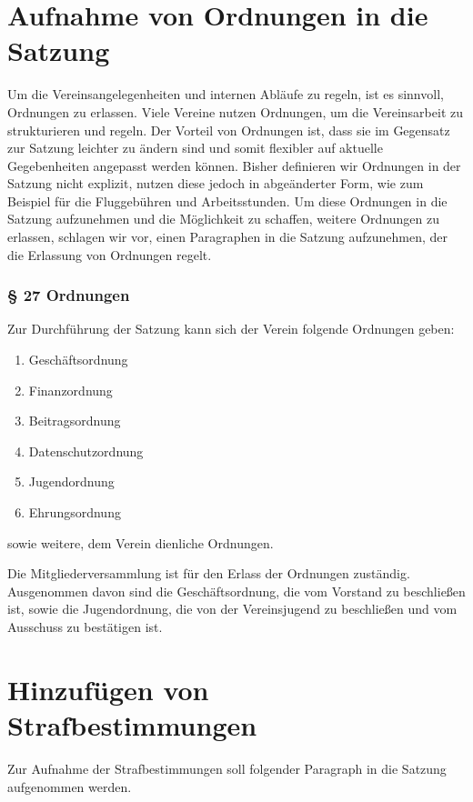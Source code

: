 \documentclass[10pt,a4paper,parskip=half]{scrartcl}
\newcommand{\change}[1]{
  \begin{adjustwidth}{20pt}{20pt}
    #1
  \end{adjustwidth}
}
\begin{document}
  \section{Aufnahme von Ordnungen in die Satzung}
  Um die Vereinsangelegenheiten und internen Abläufe zu regeln, ist es sinnvoll, Ordnungen zu erlassen. Viele Vereine nutzen Ordnungen, um die Vereinsarbeit zu strukturieren und regeln. Der Vorteil von Ordnungen ist, dass sie im Gegensatz zur Satzung leichter zu ändern sind und somit flexibler auf aktuelle Gegebenheiten angepasst werden können. Bisher definieren wir Ordnungen in der Satzung nicht explizit, nutzen diese jedoch in abgeänderter Form, wie zum Beispiel für die Fluggebühren und Arbeitsstunden. Um diese Ordnungen in die Satzung aufzunehmen und die Möglichkeit zu schaffen, weitere Ordnungen zu erlassen, schlagen wir vor, einen Paragraphen in die Satzung aufzunehmen, der die Erlassung von Ordnungen regelt.

  \change{
    \subsubsection*{§ 27 Ordnungen}
    Zur Durchführung der Satzung kann sich der Verein folgende Ordnungen geben:
    \begin{enumerate}[label=\alph*),noitemsep]
      \item Geschäftsordnung
      \item Finanzordnung
      \item Beitragsordnung
      \item Datenschutzordnung
      \item Jugendordnung
      \item Ehrungsordnung
    \end{enumerate}
    sowie weitere, dem Verein dienliche Ordnungen.
    
    Die Mitgliederversammlung ist für den Erlass der Ordnungen zuständig.
    Ausgenommen davon sind die Geschäftsordnung,
    die vom Vorstand zu beschließen ist,
    sowie die Jugendordnung,
    die von der Vereinsjugend zu beschließen und vom Ausschuss zu bestätigen ist.
    
  }
  \section{Hinzufügen von Strafbestimmungen}

  Zur Aufnahme der Strafbestimmungen soll folgender Paragraph in die Satzung aufgenommen werden.
\end{document}
